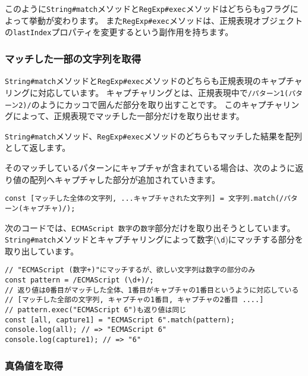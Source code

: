 このように\texttt{String\#match}メソッドと\texttt{RegExp\#exec}メソッドはどちらも\texttt{g}フラグによって挙動が変わります。
また\texttt{RegExp\#exec}メソッドは、正規表現オブジェクトの\texttt{lastIndex}プロパティを変更するという副作用を持ちます。

\hypertarget{match-capture-by-regexp}{%
\subsubsection{マッチした一部の文字列を取得}\label{match-capture-by-regexp}}

\texttt{String\#match}メソッドと\texttt{RegExp\#exec}メソッドのどちらも正規表現のキャプチャリングに対応しています。
キャプチャリングとは、正規表現中で\texttt{/パターン1(パターン2)/}のようにカッコで囲んだ部分を取り出すことです。
このキャプチャリングによって、正規表現でマッチした一部分だけを取り出せます。

\texttt{String\#match}メソッド、\texttt{RegExp\#exec}メソッドのどちらもマッチした結果を配列として返します。

そのマッチしているパターンにキャプチャが含まれている場合は、次のように返り値の配列へキャプチャした部分が追加されていきます。

\begin{lstlisting}
const [マッチした全体の文字列, ...キャプチャされた文字列] = 文字列.match(/パターン(キャプチャ)/);
\end{lstlisting}

次のコードでは、\texttt{ECMAScript 数字}の\texttt{数字}部分だけを取り出そうとしています。
\texttt{String\#match}メソッドとキャプチャリングによって数字(\texttt{\textbackslash d})にマッチする部分を取り出しています。

\begin{lstlisting}
// "ECMAScript (数字+)"にマッチするが、欲しい文字列は数字の部分のみ
const pattern = /ECMAScript (\d+)/;
// 返り値は0番目がマッチした全体、1番目がキャプチャの1番目というように対応している
// [マッチした全部の文字列, キャプチャの1番目, キャプチャの2番目 ....]
// pattern.exec("ECMAScript 6")も返り値は同じ
const [all, capture1] = "ECMAScript 6".match(pattern);
console.log(all); // => "ECMAScript 6"
console.log(capture1); // => "6"
\end{lstlisting}

\hypertarget{test-by-regexp}{%
\subsubsection{真偽値を取得}\label{test-by-regexp}}

